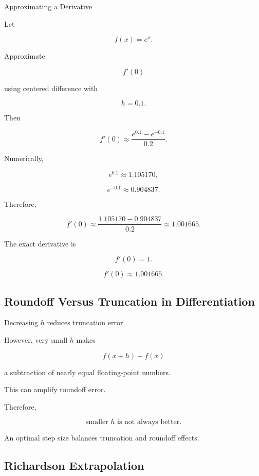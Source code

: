 \begin{workedexamplebox}{Approximating a Derivative}

Let

\[
f(x)=e^x.
\]

Approximate

\[
f'(0)
\]

using centered difference with

\[
h=0.1.
\]

Then

\[
f'(0)
\approx
\frac{
e^{0.1}-e^{-0.1}
}{
0.2
}.
\]

Numerically,

\[
e^{0.1}\approx1.105170,
\]

\[
e^{-0.1}\approx0.904837.
\]

Therefore,

\[
f'(0)
\approx
\frac{
1.105170-0.904837
}{
0.2
}
\approx1.001665.
\]

The exact derivative is

\[
f'(0)=1.
\]

\begin{answerbox}
\[
\boxed{
f'(0)\approx1.001665.
}
\]
\end{answerbox}

\end{workedexamplebox}

\subsection{Roundoff Versus Truncation in Differentiation}
\label{subsec:differentiation-roundoff-truncation}

Decreasing \(h\) reduces truncation error.

However, very small \(h\) makes

\[
f(x+h)-f(x)
\]

a subtraction of nearly equal floating-point numbers.

This can amplify roundoff error.

Therefore,

\[
\boxed{
\text{smaller }h
\text{ is not always better}.
}
\]

An optimal step size balances truncation and roundoff effects.

\subsection{Richardson Extrapolation}
\label{subsec:richardson-extrapolation}

